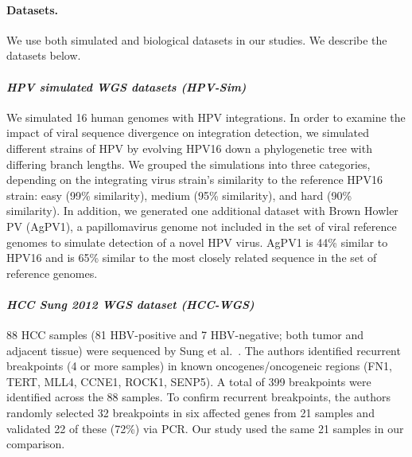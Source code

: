 \documentclass[10pt]{article}
\begin{document}

\paragraph{\textbf{Datasets.}}  We use both simulated and biological datasets in our studies.  We describe the datasets below.

\paragraph{\emph{HPV simulated WGS datasets (HPV-Sim)}}
We simulated 16 human genomes with HPV integrations.  In order to examine the impact of viral sequence divergence on integration detection, we simulated different strains of HPV by evolving HPV16 down a phylogenetic tree with differing branch lengths.  We grouped the simulations into three categories, depending on the integrating virus strain's similarity to the reference HPV16 strain: easy (99\% similarity), medium (95\% similarity), and hard (90\% similarity).  In addition, we generated one additional dataset with Brown Howler PV (AgPV1), a papillomavirus genome not included in the set of viral reference genomes to simulate detection of a novel HPV virus.  AgPV1 is 44\% similar to HPV16 and is 65\% similar to the most closely related sequence in the set of reference genomes.


\paragraph{\emph{HCC Sung 2012 WGS dataset (HCC-WGS)}}
88 HCC samples (81 HBV-positive and 7 HBV-negative; both tumor and adjacent tissue) were sequenced by Sung et al.~\cite{Sung2012}.  The authors identified recurrent breakpoints (4 or more samples) in known oncogenes/oncogeneic regions (FN1, TERT, MLL4, CCNE1, ROCK1, SENP5).  A total of 399 breakpoints were identified across the 88 samples.  To confirm recurrent breakpoints, the authors randomly selected 32 breakpoints in six affected genes from 21 samples and validated 22 of these (72\%) via PCR.  Our study used the same 21 samples in our comparison.
\end{document}
